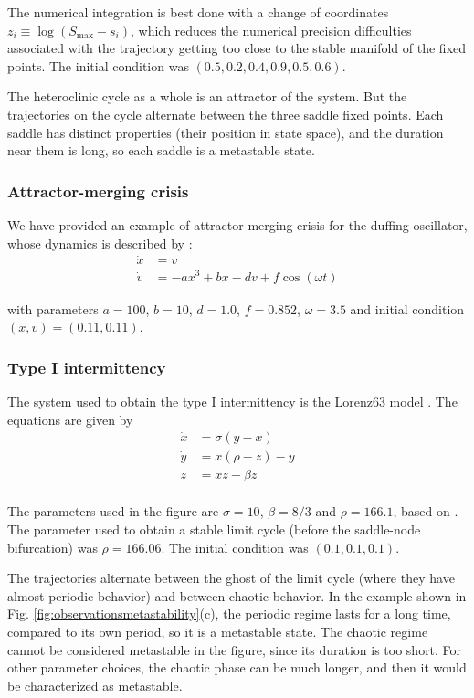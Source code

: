 \documentclass[reprint,onecolumn,superscriptaddress,showpacs,amsmath,amssymb,aps,floatfix]{revtex4-2}
\theoremstyle{definition}
\begin{document}
The numerical integration is best done with a change of coordinates $z_i \equiv \log(S_\mathrm{max} - s_i)$, which reduces the numerical precision difficulties associated with the trajectory getting too close to the stable manifold of the fixed points. The initial condition was $(0.5, 0.2, 0.4, 0.9, 0.5, 0.6)$. 

The heteroclinic cycle as a whole is an attractor of the system. But the trajectories on the cycle alternate between the three saddle fixed points. Each saddle has distinct properties (their position in state space), and the duration near them is long, so each saddle is a metastable state.

\subsubsection{Attractor-merging crisis}
We have provided an example of attractor-merging crisis for the duffing oscillator, whose dynamics is described by \cite{ishii1986breakdown}: 
%
\begin{align}
    \dot{x} &= v \\ 
    \dot{v} &= -ax^3 + bx -dv + f \cos(\omega t) 
\end{align}

with parameters $a = 100$, $b = 10$, $d = 1.0$, $f = 0.852$, $\omega = 3.5$ and initial condition $(x,v) = (0.11, 0.11)$.

\subsubsection{Type I intermittency}
The system used to obtain the type I intermittency is the Lorenz63 model \cite{lorenz1963deterministic}. The equations are given by 
\begin{align}
    \dot{x} &= \sigma(y - x) \\ 
    \dot{y} &= x(\rho - z) - y \\ 
    \dot{z} &= xz - \beta z \\
\end{align}

The parameters used in the figure are $\sigma = 10$, $\beta = 8/3$ and $\rho = 166.1$, based on \cite{yorke1979metastable}. The parameter used to obtain a stable limit cycle (before the saddle-node bifurcation) was $\rho = 166.06$. The initial condition was $(0.1, 0.1, 0.1)$. 


The trajectories alternate between the ghost of the limit cycle (where they have almost periodic behavior) and between chaotic behavior. In the example shown in Fig. \ref{fig:observationsmetastability}(c), the periodic regime lasts for a long time, compared to its own period, so it is a metastable state. The chaotic regime cannot be considered metastable in the figure, since its duration is too short. For other parameter choices, the chaotic phase can be much longer, and then it would be characterized as metastable. 
\end{document}
